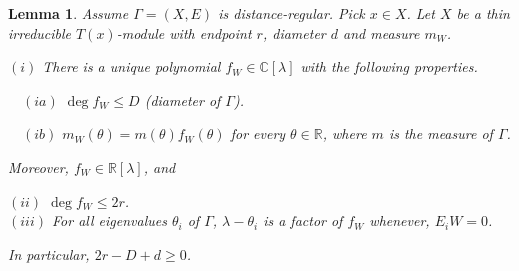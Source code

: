 \documentclass[
]{book}
\newtheorem{lemma}{Lemma}[chapter]
\theoremstyle{definition}
\theoremstyle{definition}
\theoremstyle{definition}
\theoremstyle{definition}
\theoremstyle{remark}
\begin{document}
\begin{lemma}
\protect\hypertarget{lem:basic-data}{}\label{lem:basic-data}Assume \(\Gamma = (X, E)\) is distance-regular. Pick \(x\in X\). Let \(X\) be a thin irreducible \(T(x)\)-module with endpoint \(r\), diameter \(d\) and measure \(m_W\).

\((i)\) There is a unique polynomial \(f_W \in \mathbb{C}[\lambda]\) with the following properties.

\(\quad (ia)\) \(\deg f_W \leq D\) (diameter of \(\Gamma\)).

\(\quad (ib)\) \(m_W(\theta) = m(\theta)f_W(\theta)\) for every \(\theta\in \mathbb{R}\), where \(m\) is the measure of \(\Gamma\).

Moreover, \(f_W\in \mathbb{R}[\lambda]\), and

\((ii)\) \(\deg f_W \leq 2r\).\\
\((iii)\) For all eigenvalues \(\theta_i\) of \(\Gamma\), \(\lambda - \theta_i\) is a factor of \(f_W\) whenever, \(E_iW = 0\).

In particular, \(2r-D+d\geq 0\).
\end{lemma}
\end{document}

